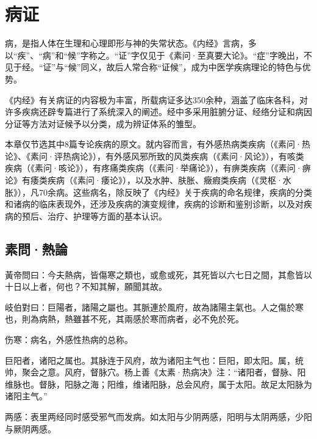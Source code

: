 \documentclass[draft,12pt]{ctexbook}
\begin{document}
\pagestyle{main2}
\fi
\chapter{病证}%

病，是指人体在生理和心理即形与神的失常状态。《内经》言病，多以“疾”、“病”和“候”字称之。“证”字仅见于《素问·至真要大论》。“症”字晚出，不见于经。“证”与“候”同义，故后人常合称“证候”，成为中医学疾病理论的特色与优势。

《内经》有关病证的内容极为丰富，所载病证多达350余种，涵盖了临床各科，对许多疾病还辟专篇进行了系统深入的阐述。经中多采用脏腑分证、经络分证和病因分证等方法对证候予以分类，成为辨证体系的雏型。

本章仅节选其中8篇专论疾病的原文。就内容而言，有外感热病类疾病（《素问·热论》、《素问·评热病论》），有外感风邪所致的风类疾病（《素问·风论》），有咳类疾病（《素问·咳论》），有疼痛类疾病（《素问·举痛论》），有痹类疾病（《素问·痹论》有痿类疾病（《素问·痿论》），以及水肿、肤胀、癥瘕类疾病（《灵枢·水胀》），凡70余病。这些病名，除反映了《内经》关于疾病的命名规律，疾病的分类和诸病的临床表现外，还涉及疾病的演变规律，疾病的诊断和鉴别诊断，以及对疾病的预后、治疗、护理等方面的基本认识。

\section{素問·熱論}%


\begin{yuanwen}
黃帝問曰：今夫熱病，皆傷寒之類也，或愈或死，其死皆以六七日之間，其愈皆以十日以上者，何也？不知其解，願聞其故。

岐伯對曰：巨陽者，諸陽之屬也。其脈連於風府，故為諸陽主氣也。人之傷於寒也，則為病熱，熱雖甚不死，其兩感於寒而病者，必不免於死。
\end{yuanwen}


\begin{jiaozhu}
  \item 伤寒：病名，外感性热病的总称。
  \item 巨阳者，诸阳之属也。其脉连于风府，故为诸阳主气也：巨阳，即太阳。属，统帅，聚会之意。风府，督脉穴。杨上善《太素·热病决》注：“诸阳者，督脉、阳维脉也。督脉，阳脉之海；阳维，维诸阳脉，总会风府，属于太阳。故足太阳脉为诸阳主气。”
  \item 两感：表里两经同时感受邪气而发病。如太阳与少阴两感，阳明与太阴两感，少阳与厥阴两感。
\end{jiaozhu}
\end{document}
